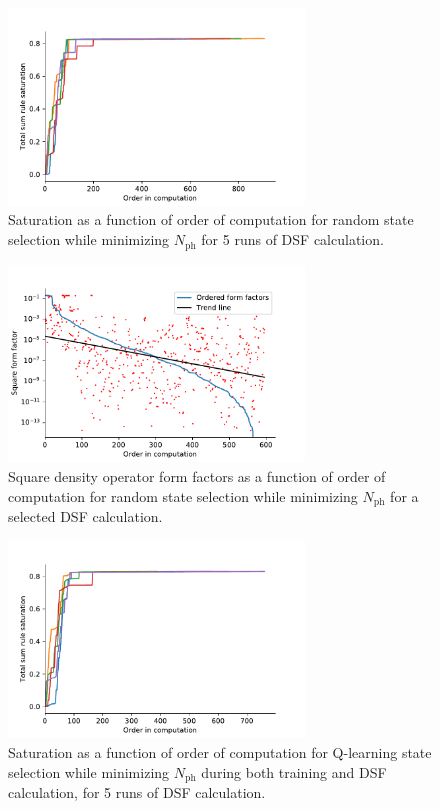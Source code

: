 \documentclass[11pt, a4paper]{report} %
\begin{document}
\begin{figure}[tb!]
  \centering
  \includegraphics[width=0.7\textwidth]{saturation_histories_rand_True_check_train_False_check_eval_True.pdf}
  \caption{Saturation as a function of order of computation for random state selection while minimizing \(N_{\mathrm{ph}}\) for 5 runs of DSF calculation.}
\end{figure}

\begin{figure}[tb!]
  \centering
  \includegraphics[width=0.7\textwidth]{ff_sizes_rand_True_check_train_False_check_eval_True.pdf}
  \caption{Square density operator form factors as a function of order of computation for random state selection while minimizing \(N_{\mathrm{ph}}\) for a selected DSF calculation.}
\end{figure}

\begin{figure}[tb!]
  \centering
  \includegraphics[width=0.7\textwidth]{saturation_histories_rand_False_check_train_True_check_eval_True.pdf}
  \caption{Saturation as a function of order of computation for Q-learning state selection while minimizing \(N_{\mathrm{ph}}\) during both training and DSF calculation, for 5 runs of DSF calculation.}\label{fig:saturation_histories_rand_False_check_train_True_check_eval_True}
\end{figure}
\end{document}
